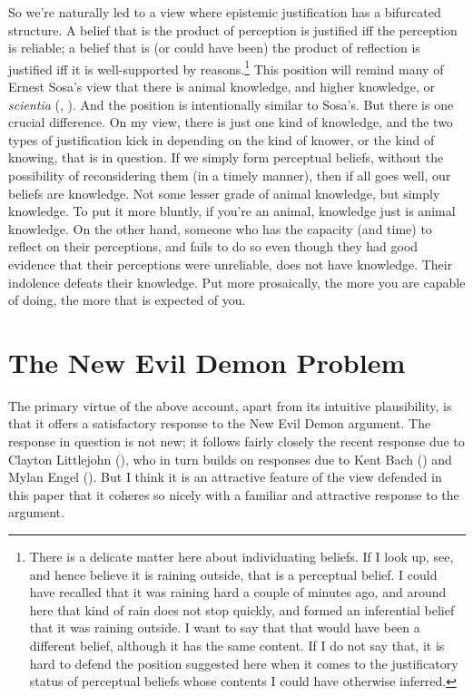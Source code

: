 \documentclass[
  10pt,
  letterpaper,
  DIV=11,
  numbers=noendperiod,
  twoside]{scrartcl}
\begin{document}
So we're naturally led to a view where epistemic justification has a
bifurcated structure. A belief that is the product of perception is
justified iff the perception is reliable; a belief that is (or could
have been) the product of reflection is justified iff it is
well-supported by reasons.\footnote{There is a delicate matter here
  about individuating beliefs. If I look up, see, and hence believe it
  is raining outside, that is a perceptual belief. I could have recalled
  that it was raining hard a couple of minutes ago, and around here that
  kind of rain does not stop quickly, and formed an inferential belief
  that it was raining outside. I want to say that that would have been a
  different belief, although it has the same content. If I do not say
  that, it is hard to defend the position suggested here when it comes
  to the justificatory status of perceptual beliefs whose contents I
  could have otherwise inferred.} This position will remind many of
Ernest Sosa's view that there is animal knowledge, and higher knowledge,
or \emph{scientia} (,
). And the position is intentionally
similar to Sosa's. But there is one crucial difference. On my view,
there is just one kind of knowledge, and the two types of justification
kick in depending on the kind of knower, or the kind of knowing, that is
in question. If we simply form perceptual beliefs, without the
possibility of reconsidering them (in a timely manner), then if all goes
well, our beliefs are knowledge. Not some lesser grade of animal
knowledge, but simply knowledge. To put it more bluntly, if you're an
animal, knowledge just is animal knowledge. On the other hand, someone
who has the capacity (and time) to reflect on their perceptions, and
fails to do so even though they had good evidence that their perceptions
were unreliable, does not have knowledge. Their indolence defeats their
knowledge. Put more prosaically, the more you are capable of doing, the
more that is expected of you.

\section{The New Evil Demon Problem}\label{the-new-evil-demon-problem}

The primary virtue of the above account, apart from its intuitive
plausibility, is that it offers a satisfactory response to the New Evil
Demon argument. The response in question is not new; it follows fairly
closely the recent response due to Clayton Littlejohn
(), who in turn builds on responses
due to Kent Bach () and Mylan Engel
(). But I think it is an attractive
feature of the view defended in this paper that it coheres so nicely
with a familiar and attractive response to the argument.
\end{document}

